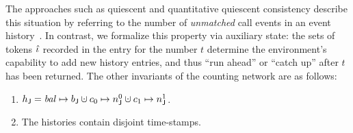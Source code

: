 The approaches such as quiescent and quantitative quiescent
consistency describe this situation by referring to the number of
\emph{unmatched} call events in an event
history~\cite{Derrick-al:FM14,Jagadeesan-Riely:ICALP14}. In contrast,
we formalize this property via auxiliary state: the sets of tokens
$\hat{\iota}$ recorded in the entry for the number $t$ determine the
environment's capability to add new history entries, and thus ``run
ahead'' or ``catch up'' after $t$ has been returned.
%
%
The other invariants of the counting network are as follows:
\vspace{2pt}
\begin{enumerate}[label=(\roman*)]

%


\item\label{cn:state} $\heapj = \bal \mapsto b_\joint \hunion c_0 \mapsto n^0_\joint
  \hunion c_1 \mapsto n^1_\joint$.

\item\label{cn:hvalid} The histories contain disjoint time-stamps. %
 


\end{enumerate}
